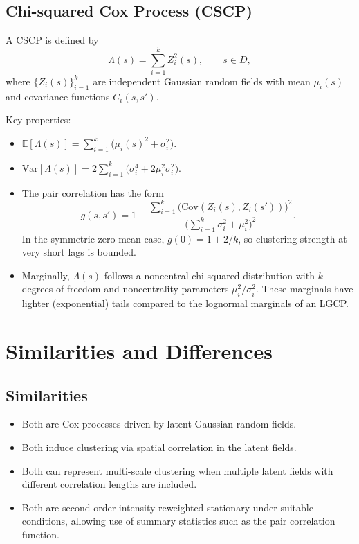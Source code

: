 \documentclass[11pt]{article}
\begin{document}
	\subsection{Chi-squared Cox Process (CSCP)}
	A CSCP is defined by
	\[
	\Lambda(s) = \sum_{i=1}^k Z_i^2(s), \qquad s \in D,
	\]
	where $\{Z_i(s)\}_{i=1}^k$ are independent Gaussian random fields with mean $\mu_i(s)$ and covariance functions $C_i(s,s')$.
	
	Key properties:
	\begin{itemize}
		\item $\mathbb{E}[\Lambda(s)] = \sum_{i=1}^k \big( \mu_i(s)^2 + \sigma_i^2 \big)$.
		\item $\mathrm{Var}[\Lambda(s)] = 2\sum_{i=1}^k \big(\sigma_i^4 + 2\mu_i^2\sigma_i^2 \big)$.
		\item The pair correlation has the form
		\[
		g(s,s') = 1 + \frac{\sum_{i=1}^k \big( \mathrm{Cov}(Z_i(s),Z_i(s')) \big)^2}{\big( \sum_{i=1}^k \sigma_i^2 + \mu_i^2 \big)^2}.
		\]
		In the symmetric zero-mean case, $g(0)=1+2/k$, so clustering strength at very short lags is bounded.
		\item Marginally, $\Lambda(s)$ follows a noncentral chi-squared distribution with $k$ degrees of freedom and noncentrality parameters $\mu_i^2/\sigma_i^2$. These marginals have lighter (exponential) tails compared to the lognormal marginals of an LGCP.
	\end{itemize}
	
	\section{Similarities and Differences}
	
	\subsection*{Similarities}
	\begin{itemize}
		\item Both are Cox processes driven by latent Gaussian random fields.
		\item Both induce clustering via spatial correlation in the latent fields.
		\item Both can represent multi-scale clustering when multiple latent fields with different correlation lengths are included.
		\item Both are second-order intensity reweighted stationary under suitable conditions, allowing use of summary statistics such as the pair correlation function.
	\end{itemize}
	
\end{document}
